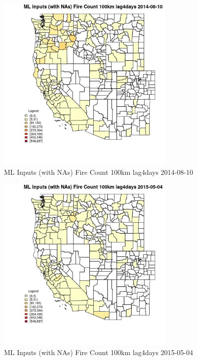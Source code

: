 \begin{figure} 
\centering  
\includegraphics[width=0.77\textwidth]{Code_Outputs/Report_ML_input_PM25_Step4_part_e_de_duplicated_aves_compiled_2019-05-18wNAs_CountyFire_Count_100km_lag4daysMean2014-08-10.jpg} 
\caption{\label{fig:Report_ML_input_PM25_Step4_part_e_de_duplicated_aves_compiled_2019-05-18wNAsCountyFire_Count_100km_lag4daysMean2014-08-10}ML Inputs (with NAs) Fire Count 100km lag4days 2014-08-10} 
\end{figure} 
 

\begin{figure} 
\centering  
\includegraphics[width=0.77\textwidth]{Code_Outputs/Report_ML_input_PM25_Step4_part_e_de_duplicated_aves_compiled_2019-05-18wNAs_CountyFire_Count_100km_lag4daysMean2015-05-04.jpg} 
\caption{\label{fig:Report_ML_input_PM25_Step4_part_e_de_duplicated_aves_compiled_2019-05-18wNAsCountyFire_Count_100km_lag4daysMean2015-05-04}ML Inputs (with NAs) Fire Count 100km lag4days 2015-05-04} 
\end{figure} 
 

